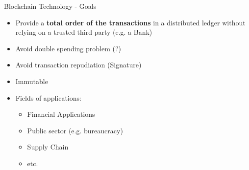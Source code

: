 \begin{frame}{Blockchain Technology - Goals}
    \begin{itemize}

        \item Provide a \textbf{total order of the transactions} in a distributed ledger
        without relying on a trusted third party (e.g. a Bank)

        \item Avoid double spending problem (?)


        \item Avoid transaction repudiation (Signature)
        
        \item Immutable
		\item Fields of applications:
        \begin{itemize}
        \item Financial Applications
        \item Public sector (e.g. bureaucracy)
        \item Supply Chain
        \item etc.
        \end{itemize}
    \end{itemize}
    
    
\end{frame}
